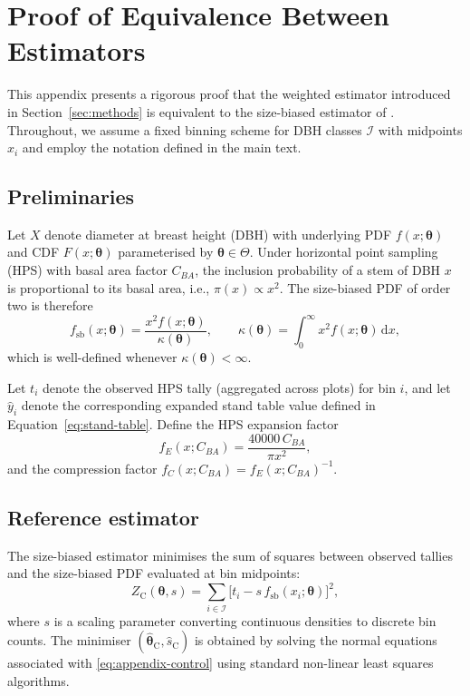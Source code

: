 \section{Proof of Equivalence Between Estimators}
\label{sec:appendix-equivalence}

This appendix presents a rigorous proof that the weighted estimator introduced
in Section~\ref{sec:methods} is equivalent to the size-biased estimator of
\citet{van1986, ducey2015}. Throughout, we assume a fixed binning scheme for
DBH classes $\mathcal{I}$ with midpoints $x_i$ and employ the notation defined
in the main text.

\subsection{Preliminaries}

Let $X$ denote diameter at breast height (DBH) with underlying PDF
$f(x;\boldsymbol{\theta})$ and CDF $F(x;\boldsymbol{\theta})$ parameterised by
$\boldsymbol{\theta}\in\Theta$. Under horizontal point sampling (HPS) with basal
area factor $C_{BA}$, the inclusion probability of a stem of DBH $x$ is
proportional to its basal area, i.e., $\pi(x)\propto x^2$. The size-biased PDF
of order two is therefore
\begin{equation}
  f_{\mathrm{sb}}(x;\boldsymbol{\theta})
  =
  \frac{x^{2} f(x;\boldsymbol{\theta})}{\kappa(\boldsymbol{\theta})},
  \qquad
  \kappa(\boldsymbol{\theta})
  =
  \int_{0}^{\infty} x^{2} f(x;\boldsymbol{\theta})\,\mathrm{d}x,
\end{equation}
which is well-defined whenever $\kappa(\boldsymbol{\theta}) < \infty$.

Let $t_i$ denote the observed HPS tally (aggregated across plots) for bin $i$,
and let $\hat{y}_i$ denote the corresponding expanded stand table value defined
in Equation~\eqref{eq:stand-table}. Define the HPS expansion factor
\begin{equation}
  f_E(x; C_{BA}) = \frac{40000 \, C_{BA}}{\pi x^2},
\end{equation}
and the compression factor $f_C(x; C_{BA}) = f_E(x; C_{BA})^{-1}$.

\subsection{Reference estimator}

The size-biased estimator minimises the sum of squares between observed tallies
and the size-biased PDF evaluated at bin midpoints:
\begin{equation}
  Z_{\mathrm{C}}(\boldsymbol{\theta}, s)
  =
  \sum_{i \in \mathcal{I}}
  \Big[t_i - s\, f_{\mathrm{sb}}(x_i; \boldsymbol{\theta})\Big]^2,
  \label{eq:appendix-control}
\end{equation}
where $s$ is a scaling parameter converting continuous densities to discrete
bin counts. The minimiser $(\hat{\boldsymbol{\theta}}_{\mathrm{C}},\hat{s}_{\mathrm{C}})$ is
obtained by solving the normal equations associated with
\eqref{eq:appendix-control} using standard non-linear least squares algorithms.

